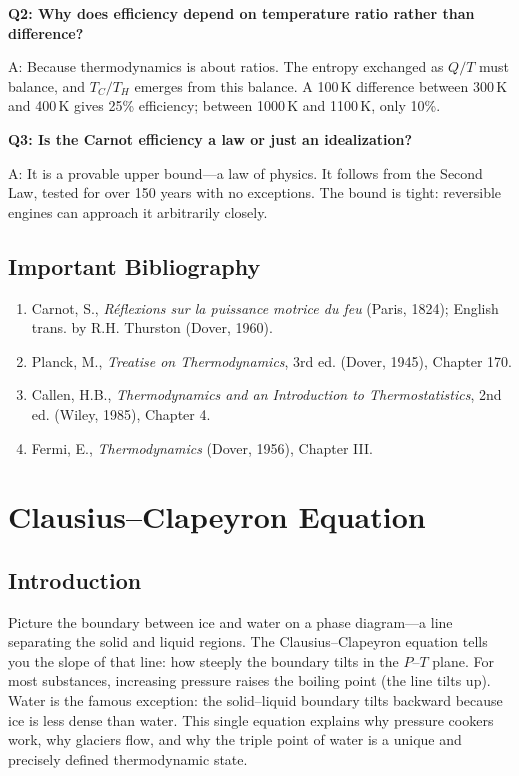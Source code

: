 \documentclass[11pt,openright]{book}
\begin{document}
\textbf{Q2: Why does efficiency depend on temperature ratio rather than difference?}

A: Because thermodynamics is about ratios. The entropy exchanged as $Q/T$ must balance, and $T_C/T_H$ emerges from this balance. A 100\,K difference between 300\,K and 400\,K gives 25\% efficiency; between 1000\,K and 1100\,K, only 10\%.

\textbf{Q3: Is the Carnot efficiency a law or just an idealization?}

A: It is a provable upper bound---a law of physics. It follows from the Second Law, tested for over 150 years with no exceptions. The bound is tight: reversible engines can approach it arbitrarily closely.
\section*{Important Bibliography}

\begin{enumerate}
\item Carnot, S., \textit{R\'eflexions sur la puissance motrice du feu} (Paris, 1824); English trans. by R.H. Thurston (Dover, 1960).
\item Planck, M., \textit{Treatise on Thermodynamics}, 3rd ed. (Dover, 1945), Chapter 170.
\item Callen, H.B., \textit{Thermodynamics and an Introduction to Thermostatistics}, 2nd ed. (Wiley, 1985), Chapter 4.
\item Fermi, E., \textit{Thermodynamics} (Dover, 1956), Chapter III.
\end{enumerate}


\chapter{Clausius--Clapeyron Equation}

\section*{Introduction}

Picture the boundary between ice and water on a phase diagram---a line separating the solid and liquid regions. The Clausius--Clapeyron equation tells you the slope of that line: how steeply the boundary tilts in the $P$--$T$ plane. For most substances, increasing pressure raises the boiling point (the line tilts up). Water is the famous exception: the solid--liquid boundary tilts backward because ice is less dense than water. This single equation explains why pressure cookers work, why glaciers flow, and why the triple point of water is a unique and precisely defined thermodynamic state.
\end{document}
